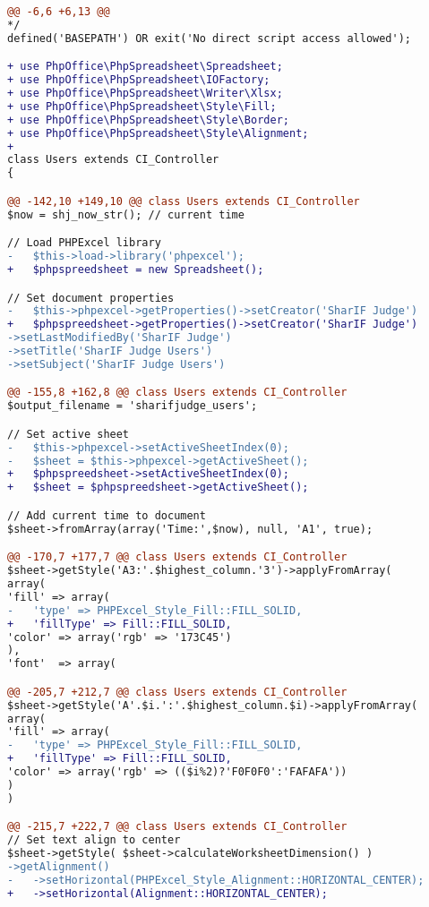 \begin{lstlisting}[language=diff, caption=Perubahan kode program pada \textit{Users.php}, label=lstt:9, basicstyle=\ttfamily, frame=single,
columns=fullflexible, keepspaces=true, breaklines=true]
@@ -6,6 +6,13 @@
*/
defined('BASEPATH') OR exit('No direct script access allowed');

+ use PhpOffice\PhpSpreadsheet\Spreadsheet;
+ use PhpOffice\PhpSpreadsheet\IOFactory;
+ use PhpOffice\PhpSpreadsheet\Writer\Xlsx;
+ use PhpOffice\PhpSpreadsheet\Style\Fill;
+ use PhpOffice\PhpSpreadsheet\Style\Border;
+ use PhpOffice\PhpSpreadsheet\Style\Alignment;
+ 
class Users extends CI_Controller
{

@@ -142,10 +149,10 @@ class Users extends CI_Controller
$now = shj_now_str(); // current time

// Load PHPExcel library
-   $this->load->library('phpexcel');
+   $phpspreedsheet = new Spreadsheet();

// Set document properties
-   $this->phpexcel->getProperties()->setCreator('SharIF Judge')
+   $phpspreedsheet->getProperties()->setCreator('SharIF Judge')
->setLastModifiedBy('SharIF Judge')
->setTitle('SharIF Judge Users')
->setSubject('SharIF Judge Users')

@@ -155,8 +162,8 @@ class Users extends CI_Controller
$output_filename = 'sharifjudge_users';

// Set active sheet
-   $this->phpexcel->setActiveSheetIndex(0);
-   $sheet = $this->phpexcel->getActiveSheet();
+   $phpspreedsheet->setActiveSheetIndex(0);
+   $sheet = $phpspreedsheet->getActiveSheet();

// Add current time to document
$sheet->fromArray(array('Time:',$now), null, 'A1', true);

@@ -170,7 +177,7 @@ class Users extends CI_Controller
$sheet->getStyle('A3:'.$highest_column.'3')->applyFromArray(
array(
'fill' => array(
-   'type' => PHPExcel_Style_Fill::FILL_SOLID,
+   'fillType' => Fill::FILL_SOLID,
'color' => array('rgb' => '173C45')
),
'font'  => array(

@@ -205,7 +212,7 @@ class Users extends CI_Controller
$sheet->getStyle('A'.$i.':'.$highest_column.$i)->applyFromArray(
array(
'fill' => array(
-   'type' => PHPExcel_Style_Fill::FILL_SOLID,
+   'fillType' => Fill::FILL_SOLID,
'color' => array('rgb' => (($i%2)?'F0F0F0':'FAFAFA'))
)
)

@@ -215,7 +222,7 @@ class Users extends CI_Controller
// Set text align to center
$sheet->getStyle( $sheet->calculateWorksheetDimension() )
->getAlignment()
-   ->setHorizontal(PHPExcel_Style_Alignment::HORIZONTAL_CENTER);
+   ->setHorizontal(Alignment::HORIZONTAL_CENTER);


\end{lstlisting}
